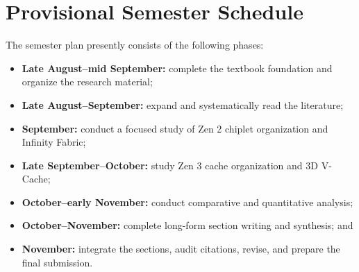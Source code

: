 \clearpage
\section{Provisional Semester Schedule}
\label{sec:schedule}

The semester plan presently consists of the following phases:

\begin{itemize}
  \item \textbf{Late August--mid September:} complete the textbook foundation and organize the research material;
  \item \textbf{Late August--September:} expand and systematically read the literature;
  \item \textbf{September:} conduct a focused study of Zen 2 chiplet organization and Infinity Fabric;
  \item \textbf{Late September--October:} study Zen 3 cache organization and 3D V-Cache;
  \item \textbf{October--early November:} conduct comparative and quantitative analysis;
  \item \textbf{October--November:} complete long-form section writing and synthesis; and
  \item \textbf{November:} integrate the sections, audit citations, revise, and prepare the final submission.
\end{itemize}


